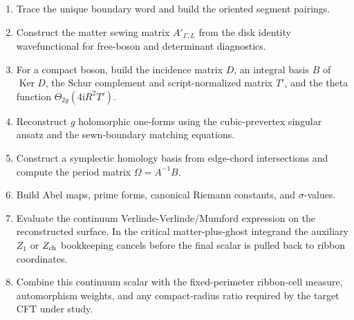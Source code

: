 \documentclass[11pt]{article}
\numberwithin{equation}{section}
\newcommand{\ii}{\mathrm i}
\newcommand{\Ker}{\operatorname{Ker}}
\begin{document}
\begin{enumerate}
\item Trace the unique boundary word and build the oriented segment pairings.
\item Construct the matter sewing matrix \(A'_{\Gamma,L}\) from the disk
identity wavefunctional for free-boson and determinant diagnostics.
\item For a compact boson, build the incidence matrix \(D\), an integral basis
\(B\) of \(\Ker D\), the Schur complement and script-normalized matrix \(T'\),
and the theta function \(\Theta_{2g}(4\ii R^2T')\).
\item Reconstruct \(g\) holomorphic one-forms using the cubic-prevertex
singular ansatz and the sewn-boundary matching equations.
\item Construct a symplectic homology basis from edge-chord intersections and
compute the period matrix \(\Omega=A^{-1}B\).
\item Build Abel maps, prime forms, canonical Riemann constants, and
\(\sigma\)-values.
\item Evaluate the continuum Verlinde-Verlinde/Mumford expression on the
reconstructed surface.  In the critical matter-plus-ghost integrand the
auxiliary \(Z_1\) or \(Z_{\rm ch}\) bookkeeping cancels before the final scalar
is pulled back to ribbon coordinates.
\item Combine this continuum scalar with the fixed-perimeter ribbon-cell
measure, automorphism weights, and any compact-radius ratio required by the
target CFT under study.
\end{enumerate}
\end{document}
